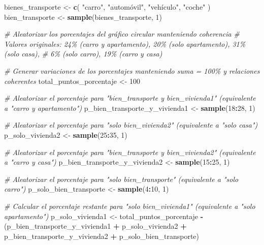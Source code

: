 \documentclass[
]{article}
\newenvironment{Shaded}{\begin{snugshade}}{\end{snugshade}}
\newcommand{\CommentTok}[1]{\textcolor[rgb]{0.56,0.35,0.01}{\textit{#1}}}
\newcommand{\DecValTok}[1]{\textcolor[rgb]{0.00,0.00,0.81}{#1}}
\newcommand{\FunctionTok}[1]{\textcolor[rgb]{0.13,0.29,0.53}{\textbf{#1}}}
\newcommand{\NormalTok}[1]{#1}
\newcommand{\OtherTok}[1]{\textcolor[rgb]{0.56,0.35,0.01}{#1}}
\newcommand{\SpecialCharTok}[1]{\textcolor[rgb]{0.81,0.36,0.00}{\textbf{#1}}}
\newcommand{\StringTok}[1]{\textcolor[rgb]{0.31,0.60,0.02}{#1}}
\begin{document}
\begin{Shaded}
\begin{Highlighting}[]
\NormalTok{bienes\_transporte }\OtherTok{\textless{}{-}} \FunctionTok{c}\NormalTok{(}
  \StringTok{"carro"}\NormalTok{, }\StringTok{"automóvil"}\NormalTok{, }\StringTok{"vehículo"}\NormalTok{, }\StringTok{"coche"}
\NormalTok{)}
\NormalTok{bien\_transporte }\OtherTok{\textless{}{-}} \FunctionTok{sample}\NormalTok{(bienes\_transporte, }\DecValTok{1}\NormalTok{)}

\CommentTok{\# Aleatorizar los porcentajes del gráfico circular manteniendo coherencia}
\CommentTok{\# Valores originales: 24\% (carro y apartamento), 20\% (solo apartamento), 31\% (solo casa),}
\CommentTok{\#                     6\% (solo carro), 19\% (carro y casa)}

\CommentTok{\# Generar variaciones de los porcentajes manteniendo suma = 100\% y relaciones coherentes}
\NormalTok{total\_puntos\_porcentaje }\OtherTok{\textless{}{-}} \DecValTok{100}

\CommentTok{\# Aleatorizar el porcentaje para "bien\_transporte y bien\_vivienda1" (equivalente a "carro y apartamento")}
\NormalTok{p\_bien\_transporte\_y\_vivienda1 }\OtherTok{\textless{}{-}} \FunctionTok{sample}\NormalTok{(}\DecValTok{18}\SpecialCharTok{:}\DecValTok{28}\NormalTok{, }\DecValTok{1}\NormalTok{)}

\CommentTok{\# Aleatorizar el porcentaje para "solo bien\_vivienda2" (equivalente a "solo casa")}
\NormalTok{p\_solo\_vivienda2 }\OtherTok{\textless{}{-}} \FunctionTok{sample}\NormalTok{(}\DecValTok{25}\SpecialCharTok{:}\DecValTok{35}\NormalTok{, }\DecValTok{1}\NormalTok{)}

\CommentTok{\# Aleatorizar el porcentaje para "bien\_transporte y bien\_vivienda2" (equivalente a "carro y casa")}
\NormalTok{p\_bien\_transporte\_y\_vivienda2 }\OtherTok{\textless{}{-}} \FunctionTok{sample}\NormalTok{(}\DecValTok{15}\SpecialCharTok{:}\DecValTok{25}\NormalTok{, }\DecValTok{1}\NormalTok{)}

\CommentTok{\# Aleatorizar el porcentaje para "solo bien\_transporte" (equivalente a "solo carro")}
\NormalTok{p\_solo\_bien\_transporte }\OtherTok{\textless{}{-}} \FunctionTok{sample}\NormalTok{(}\DecValTok{4}\SpecialCharTok{:}\DecValTok{10}\NormalTok{, }\DecValTok{1}\NormalTok{)}

\CommentTok{\# Calcular el porcentaje restante para "solo bien\_vivienda1" (equivalente a "solo apartamento")}
\NormalTok{p\_solo\_vivienda1 }\OtherTok{\textless{}{-}}\NormalTok{ total\_puntos\_porcentaje }\SpecialCharTok{{-}}\NormalTok{ (p\_bien\_transporte\_y\_vivienda1 }\SpecialCharTok{+}\NormalTok{ p\_solo\_vivienda2 }\SpecialCharTok{+}
\NormalTok{                                              p\_bien\_transporte\_y\_vivienda2 }\SpecialCharTok{+}\NormalTok{ p\_solo\_bien\_transporte)}


\end{Highlighting}
\end{Shaded}
\end{document}
